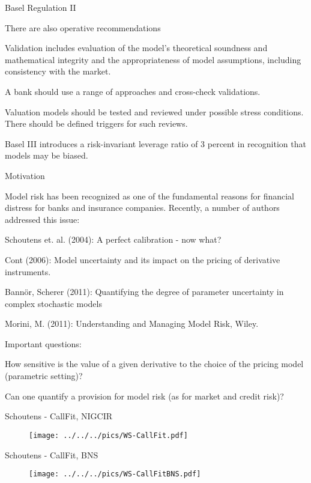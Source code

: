 {Basel Regulation II}

\item<1-> There are also operative recommendations
\item Validation includes evaluation of the model's theoretical soundness and mathematical integrity and the appropriateness of model assumptions, including consistency with the market.
\item A bank should use a range of approaches and cross-check validations.
\item Valuation models should be tested and reviewed under possible stress conditions. There should be defined triggers for such reviews.

\item<2->
Basel III introduces a risk-invariant leverage ratio of 3 percent in recognition that models may be biased.


{Motivation}
\item<1-> Model risk has been recognized as one of the fundamental reasons for financial distress for banks and insurance companies.
Recently, a number of authors addressed this issue:
\item Schoutens et. al. (2004): A perfect calibration - now what?
\item Cont (2006): Model uncertainty and its impact on the pricing of derivative instruments.
\item Bann{\"o}r, Scherer (2011): Quantifying the degree of parameter uncertainty in complex stochastic models
\item Morini, M. (2011): Understanding and Managing Model Risk, Wiley.
\item<2-> Important questions:
\item How sensitive is the value of a given derivative to the choice of the pricing model (parametric setting)?
\item Can one quantify a provision for model risk (as for market and credit risk)?


{Schoutens - CallFit, NIGCIR}
\begin{figure}[htp]
\centering
\texttt{[image: ../../../pics/WS-CallFit.pdf]}
\end{figure}

{Schoutens - CallFit, BNS}
\begin{figure}[htp]
\centering
\texttt{[image: ../../../pics/WS-CallFitBNS.pdf]}
\end{figure}

